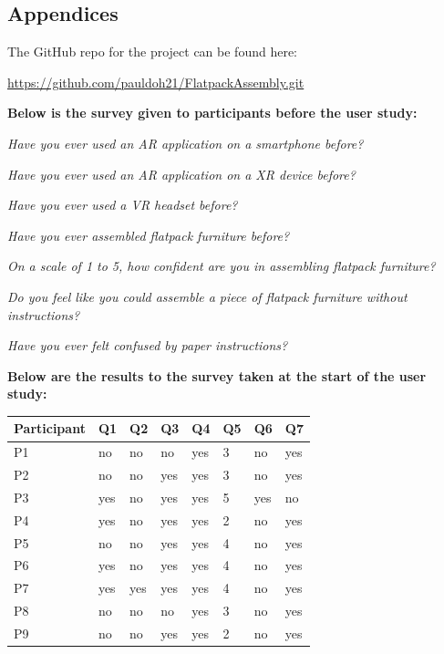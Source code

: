 \documentclass{l4proj}
\begin{document}
\begin{appendices}

\chapter{Appendices}

The GitHub repo for the project can be found here: 

\url{https://github.com/pauldoh21/FlatpackAssembly.git}

\textbf{Below is the survey given to participants before the user study:}

\textit{Have you ever used an AR application on a smartphone before?}

\textit{Have you ever used an AR application on a XR device before?}

\textit{Have you ever used a VR headset before?}

\textit{Have you ever assembled flatpack furniture before?}

\textit{On a scale of 1 to 5, how confident are you in assembling flatpack furniture?}

\textit{Do you feel like you could assemble a piece of flatpack furniture without instructions?}

\textit{Have you ever felt confused by paper instructions?}

\textbf{Below are the results to the survey taken at the start of the user study:}

\begin{table}[hbt!]
\begin{tabular}{l|lllllll}
Participant & Q1  & Q2  & Q3  & Q4  & Q5 & Q6  & Q7  \\ \hline
P1          & no  & no  & no  & yes & 3  & no  & yes \\
P2          & no  & no  & yes & yes & 3  & no  & yes \\
P3          & yes & no  & yes & yes & 5  & yes & no  \\
P4          & yes & no  & yes & yes & 2  & no  & yes \\
P5          & no  & no  & yes & yes & 4  & no  & yes \\
P6          & yes & no  & yes & yes & 4  & no  & yes \\
P7          & yes & yes & yes & yes & 4  & no  & yes \\
P8          & no  & no  & no  & yes & 3  & no  & yes \\
P9          & no  & no  & yes & yes & 2  & no  & yes
\end{tabular}
\end{table}


\end{appendices}
\end{document}
